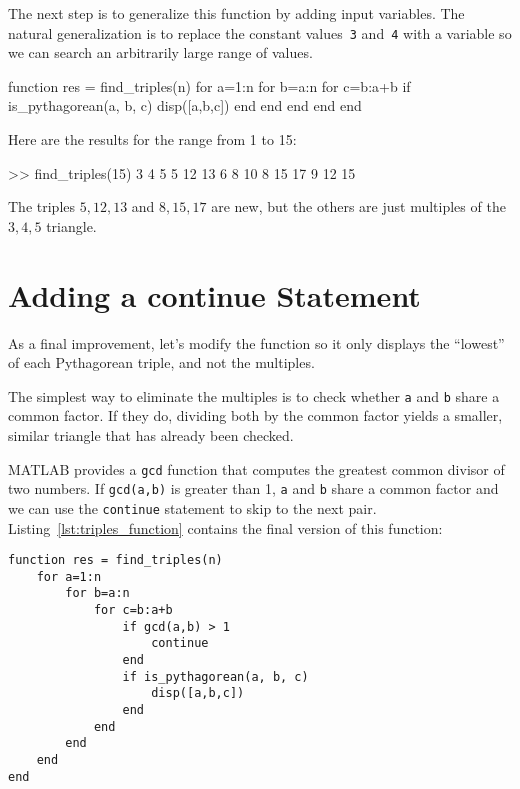 
The next step is to generalize this function by adding input
variables.  The natural generalization is to replace the constant
values~\lstinline{3} and~\lstinline{4} with a variable so we can search an arbitrarily large
range of values.

\begin{code}
function res = find_triples(n)
    for a=1:n
        for b=a:n
            for c=b:a+b
                if is_pythagorean(a, b, c)
                    disp([a,b,c])
                end
            end
        end
    end
end
\end{code}

Here are the results for the range from 1 to 15:

\begin{code}
>> find_triples(15)
     3     4     5
     5    12    13
     6     8    10
     8    15    17
     9    12    15
\end{code}

The triples $5,12,13$ and $8,15,17$ are new, but the others are just multiples of the $3,4,5$ triangle.

\section{Adding a continue Statement}


As a final improvement, let's modify the function so it only
displays the ``lowest'' of each Pythagorean triple, and not the
multiples.

The simplest way to eliminate the multiples is to check whether
\lstinline{a} and \lstinline{b} share a common factor.  If they do, dividing both
by the common factor yields a smaller, similar triangle that has
already been checked.


MATLAB provides a \lstinline{gcd} function that computes the greatest common
divisor of two numbers.  If \lstinline{gcd(a,b)} is greater than 1,
\lstinline{a} and \lstinline{b} share a common factor and we can use the \lstinline{continue}
statement to skip to the next pair. Listing~\ref{lst:triples_function} contains the final version of this function:

\begin{lstlisting}[caption={Our final Pythagorean triples function}, label={lst:triples_function}]
function res = find_triples(n)
    for a=1:n
        for b=a:n
            for c=b:a+b
                if gcd(a,b) > 1
	                continue
                end
                if is_pythagorean(a, b, c)
                    disp([a,b,c])
                end
            end
        end
    end
end
\end{lstlisting}

